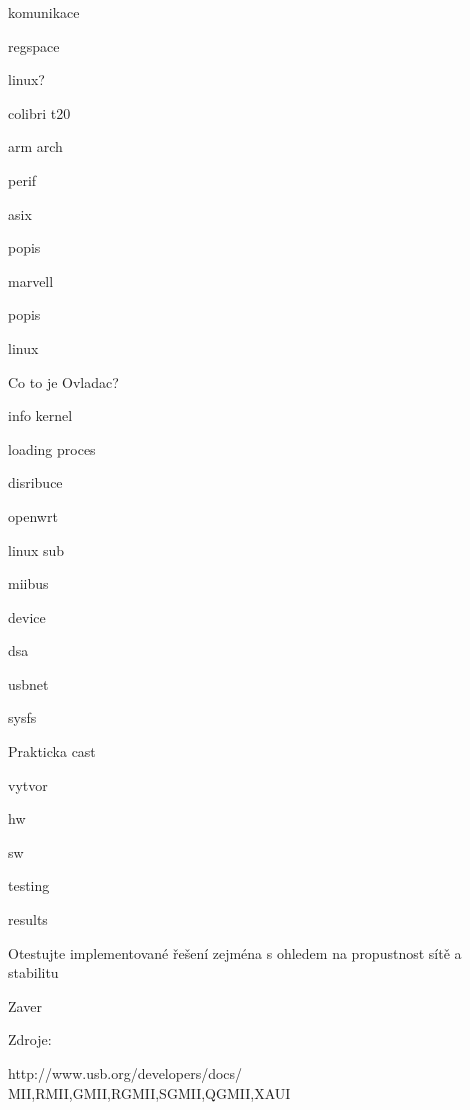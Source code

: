 \secc komunikace

\secc regspace

\secc linux?

\sec colibri t20

\secc arm arch



\secc perif

\sec asix

\secc popis

\sec marvell

\secc popis

\sec linux

\secc Co to je Ovladac?

\secc info kernel

\secc loading proces

\sec disribuce

\secc openwrt

\sec linux sub

\secc miibus

\secc device

\secc dsa

\secc usbnet

\secc sysfs

\sec Prakticka cast

\secc vytvor

\secc hw

\secc sw

\secc testing

\secc results

\secc Otestujte implementované řešení zejména s ohledem na propustnost sítě a stabilitu

\chap Zaver


\chap Zdroje:

http://www.usb.org/developers/docs/
MII,RMII,GMII,RGMII,SGMII,QGMII,XAUI
